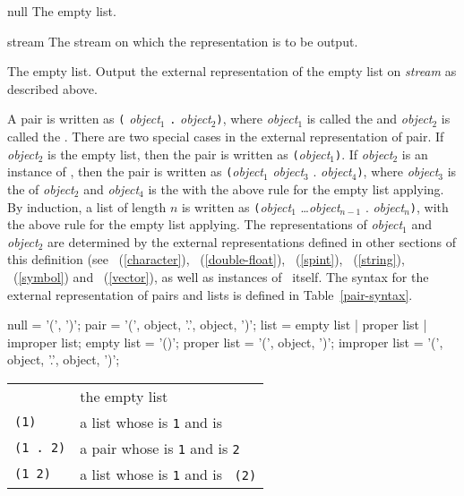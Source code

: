\begin{optDefinition}
%
\begin{specargs}
    \item[null] The empty list.
    \item[stream] The stream on which the representation is to be output.
\end{specargs}
%
\result%
The empty list.
%
\remarks%
Output the external representation of the empty list on {\em stream\/}
as described above.

%
A pair is written as \verb+(+{\em
    object}$_1$ \verb+.+ {\em object}$_2$\verb+)+, where {\em object}$_1$ is
called the  and {\em object}$_2$ is called the
.  There are two special cases in the external representation
of pair.  If {\em object}$_2$ is the empty list, then the pair is written as
\verb+(+{\em object}$_1$\verb+)+.  If {\em object$_2$} is an instance of
, then the pair is written as \verb+(+{\em object}$_1$ {\em
    object}$_3$ . {\em object$_4$}\verb+)+, where {\em object$_3$} is the
 of {\em object$_2$} and {\em object$_4$} is the
 with the above rule for the empty list applying.  By
induction, a list of length $n$ is written as \verb+(+{\em object}$_1$ \ldots {\em object$_{n-1}$}
. {\em object}$_n$\verb+)+, with the above rule for the empty list applying.
The representations of {\em object$_1$} and {\em object$_2$} are determined by
the external representations defined in other sections of this definition (see
\ (\ref{character}), \
(\ref{double-float}),
\ (\ref{spint}),
\ (\ref{string}),
\ (\ref{symbol}) and
\ (\ref{vector}), as well as instances of \
itself.  The syntax for the external representation of pairs and lists
is defined in Table~\ref{pair-syntax}.

\Syntax
\label{pair-syntax}
\savesyntax\listSyntax\vbox{\small\syntax
null
   = '(', ')';
pair
   = '(', object, '.', object, ')';
list
   = empty list | proper list | improper list;
empty list
   = '()';
proper list
   = '(', {object}, ')';
improper list
   = '(', {object}, '.', object, ')';
\endsyntax}
%
\examples
\begin{tabular}{ll}
    \nil & the empty list\\
    {\tt (1)} & a list whose \functionref{car} is {\tt 1} and \functionref{cdr} is \nil\\
    {\tt (1 . 2)} & a pair whose \functionref{car} is {\tt 1} and \functionref{cdr} is
    {\tt 2}\\
    {\tt (1 2)} & a list whose \functionref{car} is {\tt 1} and \functionref{cdr} is {\tt
        (2)}
\end{tabular}


\end{optDefinition}
